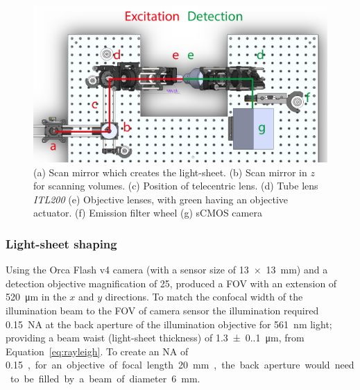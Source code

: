 \begin{figure}
	\centering
	\includegraphics[width=\linewidth]{./soldiworks_top}
	\caption[Top down schematic of SPIM]{
    (a) Scan mirror which creates the \gls{light-sheet}.
    (b) Scan mirror in \(z\) for scanning volumes.
    (c) Position of telecentric lens.
    (d) Tube lens \emph{ITL200}
    (e) Objective lenses, with green having an objective actuator.
    (f) Emission filter wheel
    (g) sCMOS camera
    }\label{fig:soldiworks_top}
\end{figure}


\subsubsection{Light-sheet shaping} %


Using the Orca Flash v4 camera (with a sensor size of \SI[product-units=repeat]{13x13}{\milli\meter}) and a detection objective magnification of \SI{25}{\times}, produced a \gls{FOV} with an extension of
\SI{520}{\micro\meter} in the \(x\) and \(y\) directions.
To match the confocal width of the illumination beam to the \gls{FOV} of camera sensor the illumination required \SI{0.15}{}~\gls{NA} at the back aperture of the illumination objective for \SI{561}{\nano\meter} light; providing a beam waist (\gls{light-sheet} thickness) of \SI{1.3(0.1)}{\micro\meter}, from Equation~\ref{eq:rayleigh}.
To create an \gls{NA} of \SI{0.15}, for an objective of focal length \SI{20}{\milli\meter}, the back aperture would need to be filled by a beam of diameter \SI{6}{\milli\meter}.

